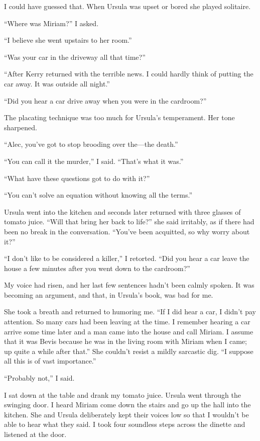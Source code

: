 \documentclass{novel}
\begin{document}
I could have guessed that. When Ursula was upset or bored she played solitaire.

“Where was Miriam?” I asked.

“I believe she went upstairs to her room.”

“Was your car in the driveway all that time?”

“After Kerry returned with the terrible news. I could hardly think of putting the car away. It was outside all night.”

“Did you hear a car drive away when you were in the cardroom?”

The placating technique was too much for Ursula’s temperament. Her tone sharpened. 

“Alec, you’ve got to stop brooding over the—the death.”

“You can call it the murder,” I said. “That’s what it was.”

“What have these questions got to do with it?”

“You can’t solve an equation without knowing all the terms.”

\scenestars

Ursula went into the kitchen and seconds later returned with three glasses of tomato juice. “Will that bring her back to life?” she said irritably, as if there had been no break in the conversation. “You’ve been acquitted, so why worry about it?”

“I don’t like to be considered a killer,” I retorted. “Did you hear a car leave the house a few minutes after you went down to the cardroom?”

My voice had risen, and her last few sentences hadn’t been calmly spoken. It was becoming an argument, and that, in Ursula’s book, was bad for me.

She took a breath and returned to humoring me. “If I did hear a car, I didn’t pay attention. So many cars had been leaving at the time. I remember hearing a car arrive some time later and a man came into the house and call Miriam. I assume that it was Bevis because he was in the living room with Miriam when I came; up quite a while after that.” She couldn’t resist a mildly sarcastic dig. “I suppose all this is of vast importance.”

“Probably not,” I said.

I sat down at the table and drank my tomato juice. Ursula went through the swinging door. I heard Miriam come down the stairs and go up the hall into the kitchen. She and Ursula deliberately kept their voices low so that I wouldn’t be able to hear what they said. I took four soundless steps across the dinette and listened at the door.
\end{document}
